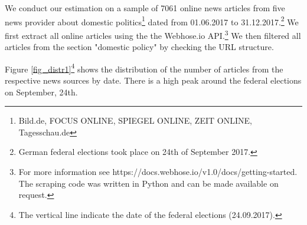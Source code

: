 \documentclass[12pt,a4paper,notitlepage]{article}
\begin{document}
We conduct our estimation on a sample of 7061 online news articles from five news provider about domestic politics\footnote{Bild.de, FOCUS ONLINE, SPIEGEL ONLINE, ZEIT ONLINE, Tagesschau.de} dated from 01.06.2017 to 31.12.2017.\footnote{German federal elections took place on 24th of September 2017.} We first extract all online articles using the the Webhose.io API.\footnote{For more information see https://docs.webhose.io/v1.0/docs/getting-started. The scraping code was written in Python and can be made available on request.} We then filtered all articles from the section "domestic policy" by checking the URL structure. 

Figure \ref{fig_distr1}\footnote{The vertical line indicate the date of the federal elections (24.09.2017).} shows the distribution of the number of articles from the respective news sources by date. There is a high peak around the federal elections on September, 24th.  
\end{document}
